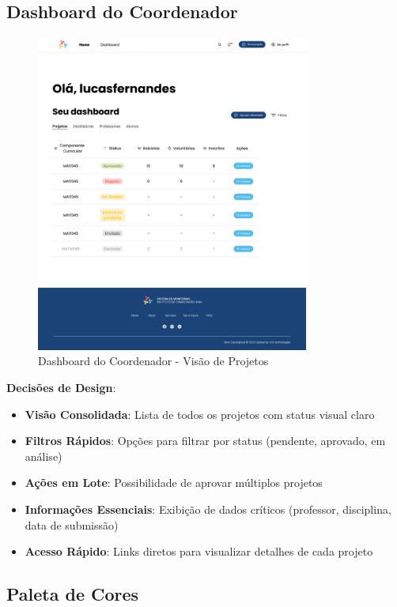 \documentclass[12pt, a4paper]{report}
\begin{document}
\subsection{Dashboard do Coordenador}

\begin{figure}[H]
\centering
\includegraphics[width=0.8\textwidth]{figma/Dashboard_coodenador.png}
\caption{Dashboard do Coordenador - Visão de Projetos}
\label{fig:dashboard}
\end{figure}

\textbf{Decisões de Design}:
\begin{itemize}
    \item \textbf{Visão Consolidada}: Lista de todos os projetos com status visual claro
    \item \textbf{Filtros Rápidos}: Opções para filtrar por status (pendente, aprovado, em análise)
    \item \textbf{Ações em Lote}: Possibilidade de aprovar múltiplos projetos
    \item \textbf{Informações Essenciais}: Exibição de dados críticos (professor, disciplina, data de submissão)
    \item \textbf{Acesso Rápido}: Links diretos para visualizar detalhes de cada projeto
\end{itemize}

\subsection{Paleta de Cores}
\end{document}

